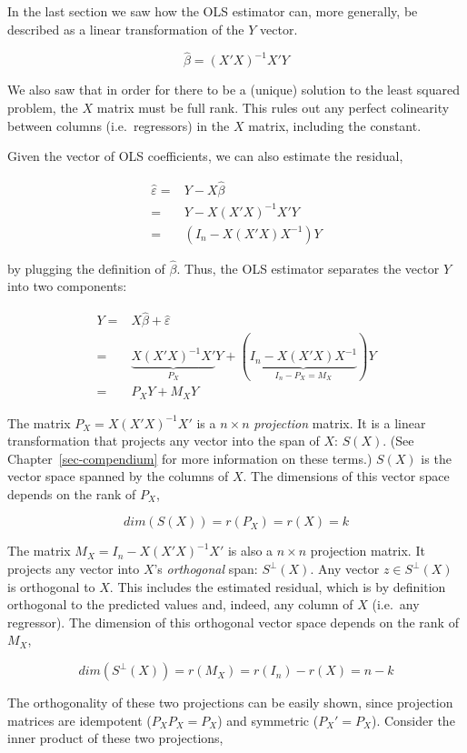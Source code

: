 \documentclass[
  letterpaper,
  DIV=11,
  numbers=noendperiod]{scrreprt}
\begin{document}
In the last section we saw how the OLS estimator can, more generally, be
described as a linear transformation of the \(Y\) vector.

\[
\hat{\beta} = (X'X)^{-1}X'Y
\]

We also saw that in order for there to be a (unique) solution to the
least squared problem, the \(X\) matrix must be full rank. This rules
out any perfect colinearity between columns (i.e.~regressors) in the
\(X\) matrix, including the constant.

Given the vector of OLS coefficients, we can also estimate the residual,

\[
\begin{align}
\hat{\varepsilon} =& Y - X\hat{\beta} \\
=&Y-X(X'X)^{-1}X'Y \\
=&(I_n-X(X'X)X^{-1})Y
\end{align}
\]

by plugging the definition of \(\hat{\beta}\). Thus, the OLS estimator
separates the vector \(Y\) into two components:

\[
\begin{align}
 Y =& X\hat{\beta} + \hat{\varepsilon} \\
=&\underbrace{X(X'X)^{-1}X'}_{P_X}Y + (\underbrace{I_n-X(X'X)X^{-1}}_{I_n-P_X = M_X})Y \\
=&P_XY + M_XY
\end{align}
\]

The matrix \(P_X = X(X'X)^{-1}X'\) is a \(n\times n\) \emph{projection}
matrix. It is a linear transformation that projects any vector into the
span of \(X\): \(S(X)\). (See Chapter~\ref{sec-compendium} for more
information on these terms.) \(S(X)\) is the vector space spanned by the
columns of \(X\). The dimensions of this vector space depends on the
rank of \(P_X\),

\[
dim(S(X)) = r(P_X) = r(X) = k
\]

The matrix \(M_X = I_n-X(X'X)^{-1}X'\) is also a \(n\times n\)
projection matrix. It projects any vector into \(X\)'s \emph{orthogonal}
span: \(S^{\perp}(X)\). Any vector \(z\in S^{\perp}(X)\) is orthogonal
to \(X\). This includes the estimated residual, which is by definition
orthogonal to the predicted values and, indeed, any column of \(X\)
(i.e.~any regressor). The dimension of this orthogonal vector space
depends on the rank of \(M_X\),

\[
dim(S^{\perp}(X)) = r(M_X) = r(I_n)-r(X) = n-k
\]

The orthogonality of these two projections can be easily shown, since
projection matrices are idempotent (\(P_XP_X = P_X\)) and symmetric
(\(P_X' = P_X\)). Consider the inner product of these two projections,
\end{document}
